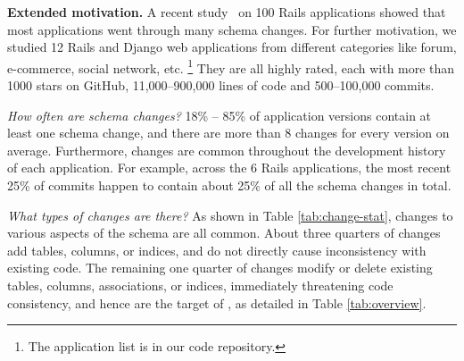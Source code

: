 


\textbf{Extended motivation.}
A recent study~\cite{wang2017verifying} on 100 Rails applications 
showed that most applications went through many schema changes.
For further motivation, we studied
12 Rails and Django web applications from different categories like forum, e-commerce, social network, etc. \footnote{The application list is in our code
repository.} They are all highly rated, each with
more than 1000 stars on GitHub, 11,000--900,000 lines of code and 500--100,000 commits. 


% 

\textit{How often are schema changes?} 18\% -- 85\% of application versions
contain at least one schema change, and there are more than 8 changes for every
version on average.
Furthermore, changes are common throughout the development history of each
application. For example, across the 6 Rails applications, the most recent 25\%
of commits happen to contain about 25\% of all the schema
changes in total.


\textit{What types of changes are there?} As shown in Table \ref{tab:change-stat},
 changes to various aspects of the schema
are all common.
About three quarters of changes add tables, columns, or indices, and
do not directly cause inconsistency with existing code. The remaining
one quarter of changes modify or delete existing tables, columns,
associations, or indices, immediately threatening code consistency, and hence
are the target of \ETool, as detailed
in Table \ref{tab:overview}.


